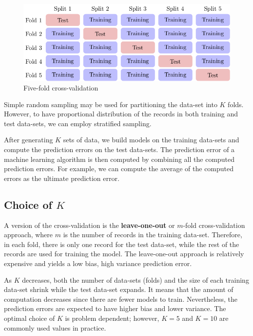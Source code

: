 \documentclass[11pt]{article}
\begin{document}
\begin{figure}[htb]
\centering
\includegraphics[width=.9\linewidth]{./images/cross-validation.png}
\caption{\label{fig:orgparagraph5}
Five-fold cross-validation}
\end{figure}

Simple random sampling may be used for partitioning the data-set into \(K\) folds. However, to have proportional distribution of the records in both training and test data-sets, we can employ stratified sampling.

After generating \(K\) sets of data, we build models on the training data-sets and compute the prediction errors on the test data-sets. The prediction error of a machine learning algorithm is then computed by combining all the computed prediction errors. For example, we can compute the average of the computed errors as the ultimate prediction error.

\subsection{Choice of \(K\)}
\label{sec:orgheadline8}
A version of the cross-validation is the \textbf{leave-one-out} or \(m\)-fold cross-validation approach, where \(m\) is the number of records in the training data-set. Therefore, in each fold, there is only one record for the test data-set, while the rest of the records are used for training the model. The leave-one-out approach is relatively expensive and yields a low bias, high variance prediction error.

As \(K\) decreases, both the number of data-sets (folds) and the size of each training data-set shrink while the test data-set expands. It means that the amount of computation decreases since there are fewer models to train. Nevertheless, the prediction errors are expected to have higher bias and lower variance. The optimal choice of \(K\) is problem dependent; however, \(K=5\) and \(K=10\) are commonly used values in practice.
\end{document}
